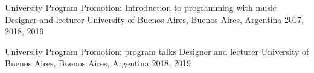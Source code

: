 

\begin{cvhonors}
  \cvhonor
    {University Program Promotion: Introduction to programming with music} %
    {Designer and lecturer} %
    {University of Buenos Aires, Buenos Aires, Argentina} %
    {2017, 2018, 2019} %
    
  \cvhonor
    {University Program Promotion: program talks} %
    {Designer and lecturer} %
    {University of Buenos Aires, Buenos Aires, Argentina} %
    {2018, 2019} %
    
\end{cvhonors}


\begin{cvpubs}
\end{cvpubs}
%
%
%
%
